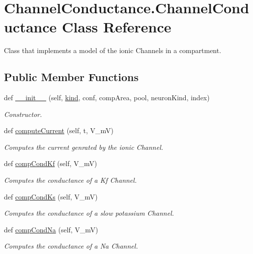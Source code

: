 \hypertarget{class_channel_conductance_1_1_channel_conductance}{}\section{Channel\+Conductance.\+Channel\+Conductance Class Reference}
\label{class_channel_conductance_1_1_channel_conductance}


Class that implements a model of the ionic Channels in a compartment.  


\subsection*{Public Member Functions}
\begin{DoxyCompactItemize}
\item 
def \hyperlink{class_channel_conductance_1_1_channel_conductance_acc92870743a2af7d3839857183ca3bb6}{\+\_\+\+\_\+init\+\_\+\+\_\+} (self, \hyperlink{class_channel_conductance_1_1_channel_conductance_a7bf3e28aab2160014358cde589f2ec39}{kind}, conf, comp\+Area, pool, neuron\+Kind, index)
\begin{DoxyCompactList}\small\item\em Constructor. \end{DoxyCompactList}\item 
def \hyperlink{class_channel_conductance_1_1_channel_conductance_af012b0816d74d6bb6a923ca79dc0a7ba}{compute\+Current} (self, t, V\+\_\+mV)
\begin{DoxyCompactList}\small\item\em Computes the current genrated by the ionic Channel. \end{DoxyCompactList}\item 
def \hyperlink{class_channel_conductance_1_1_channel_conductance_a9df028286b0ce594530f798f4a781d8c}{comp\+Cond\+Kf} (self, V\+\_\+mV)
\begin{DoxyCompactList}\small\item\em Computes the conductance of a Kf Channel. \end{DoxyCompactList}\item 
def \hyperlink{class_channel_conductance_1_1_channel_conductance_aaffacf12bc9b5f50bfcc04f49c3254ff}{comp\+Cond\+Ks} (self, V\+\_\+mV)
\begin{DoxyCompactList}\small\item\em Computes the conductance of a slow potassium Channel. \end{DoxyCompactList}\item 
def \hyperlink{class_channel_conductance_1_1_channel_conductance_a17d6343152d9252b6f1368b450f0dbcf}{comp\+Cond\+Na} (self, V\+\_\+mV)
\begin{DoxyCompactList}\small\item\em Computes the conductance of a Na Channel. \end{DoxyCompactList}\end{DoxyCompactItemize}
